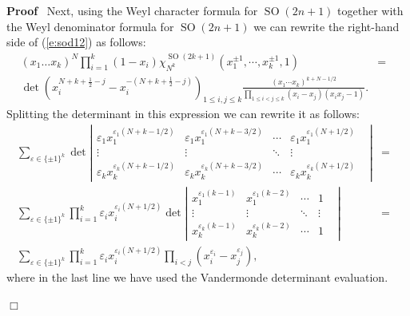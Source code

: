 \documentclass[11pt]{amsart}
\newcommand{\tmop}[1]{\ensuremath{\operatorname{#1}}}
\renewenvironment{proof}{
\noindent\textbf{Proof}\ }{\hspace*{\fill}
\begin{math}\Box\end{math}\medskip}
\begin{document}
\begin{proof}
  Next, using the Weyl character formula for $\tmop{SO}(2n + 1 )$ together with
  the Weyl denominator formula for $\tmop{SO} ( 2 n + 1 )$ we can rewrite the
  right-hand side of (\ref{e:sod12}) as follows:
  \begin{eqnarray}
    ( x_1 \ldots x_k )^N \prod_{i = 1}^k ( 1 - x_i ) \chi_{N^k}^{\tmop{SO} ( 2
    k + 1 )} ( x_1^{\pm 1}, \cdots, x_k^{\pm 1}, 1 ) & = & \label{e:detsod1}\\
    \det ( x_i^{N + k + \frac{1}{2} - j} - x_i^{- ( N + k + \frac{1}{2} - j )}
    )_{1 \leqslant i, j \leqslant k} \frac{( x_1 \cdots x_k )^{k + N - 1 /
    2}}{\prod_{1 \leqslant i < j \leqslant k} ( x_i - x_j ) ( x_i x_j - 1 )} .
    &  &  \nonumber
  \end{eqnarray}
  Splitting the determinant in this expression we can rewrite it as follows:
  \begin{eqnarray*}
    \sum_{\varepsilon \in \{ \pm 1 \}^k} \det \left| \begin{array}{ccccc}
      \varepsilon_1 x_1^{\varepsilon_1 ( N + k - 1 / 2 )} & \varepsilon_1
      x_1^{\varepsilon_1 ( N + k - 3 / 2 )} & \cdots & \varepsilon_1
      x_1^{\varepsilon_1 ( N + 1 / 2 )} & \\
      \vdots & \vdots & \ddots & \vdots & \\
      \varepsilon_k x_k^{\varepsilon_k ( N + k - 1 / 2 )} & \varepsilon_k
      x_k^{\varepsilon_k ( N + k - 3 / 2 )} & \cdots & \varepsilon_k
      x_k^{\varepsilon_k ( N + 1 / 2 )} &
    \end{array} \right| & = & \\
    \sum_{\varepsilon \in \{ \pm 1 \}^k} \prod_{i = 1}^k \varepsilon_i
    x_i^{\varepsilon_i ( N + 1 / 2 )} \det \left| \begin{array}{ccccc}
      x_1^{\varepsilon_1 ( k - 1 )} & x_1^{\varepsilon_1 ( k - 2 )} & \cdots &
      1 & \\
      \vdots & \vdots & \ddots & \vdots & \\
      x_k^{\varepsilon_k ( k - 1 )} & x_k^{\varepsilon_k ( k - 2 )} & \cdots &
      1 &
    \end{array} \right| & = & \\
    \sum_{\varepsilon \in \{ \pm 1 \}^k} \prod_{i = 1}^k \varepsilon_i
    x_i^{\varepsilon_i ( N + 1 / 2 )} \prod_{i < j} ( x_i^{\varepsilon_i} -
    x_j^{\varepsilon_j} ), &  &
  \end{eqnarray*}
  where in the last line we have used the Vandermonde determinant evaluation.


\end{proof}
\end{document}
